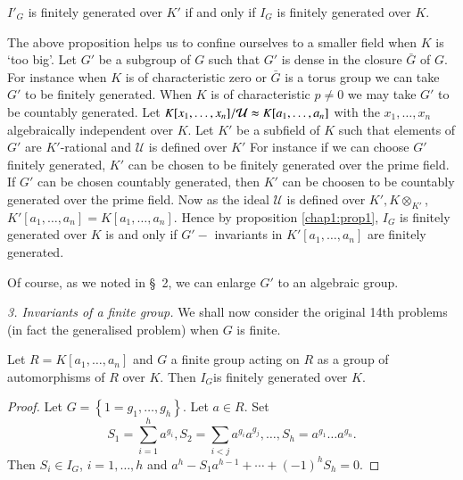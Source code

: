 \begin{proposition}\label{chap1:prop1}%
 $I'_G$ is finitely generated over $K'$ if and  only  if $I_G$ is
  finitely generated  over $K$. 
\end{proposition}

The above proposition helps us to confine ourselves to a smaller
field  when  $K$ is `too big'. Let $G'$ be a subgroup of $G$ such
that  $G'$  is dense in the  closure  $\bar{G}$ of $G$. For
instance  when  $K$ is  of characteristic zero  or $\bar{G}$ is a
torus  group  we can  take $G'$ to be  finitely generated. When  $K$ 
is  of characteristic  $p \neq 0$ we may  take $G'$ to be  countably
generated. Let  $K [x_1, \ldots , x_n] /  \mathcal{U}\thickapprox
K [a_1, \ldots , a_n]$ with the $x_1, \ldots , x_n$ algebraically
independent over $K$. Let  $K'$ be a subfield of $K$ such that
elements  of $G'$ are $K'$-rational and  $\mathcal{U}$ is defined
over $K'$ For instance  if we can choose  $G'$  finitely  generated,
$K'$ can be chosen to be finitely generated  over  the  prime
field. If  $G'$ can be  chosen  countably  generated, then  $K'$ can
be  choosen to be countably generated  over  the  prime  field. Now
as the  ideal $\mathcal{U}$ is  defined  over  $K', K \otimes_{K'}$, $K'
[a_1, \ldots , a_n]=K[a_1 , \ldots ,a_n]$. Hence by proposition
\ref{chap1:prop1}, 
$I_G$ is  finitely generated over  $K$ is and only  if $G'-$
invariants in $K' [a_1, \ldots, a_n]$ are  finitely  generated. 


Of course, as we noted  in \S\ 2, we can  enlarge  $G'$  to an
algebraic group. 

\medskip
\noindent\textit{3. Invariants of a finite group.}
 We shall  now consider  the  original 14th problems (in fact  the
 generalised problem) when   $G$ is  finite.  

\begin{thm}[E. Noether]%
 Let  $R=K [a_1, \ldots,a_n]$ and $G$ a finite group
  acting  on $R$ as a group  of automorphisms  of $R$  over  $K$. Then
  $I_G$\pageoriginale is finitely generated over $K$. 
 \end{thm}

\begin{proof}
Let $G= \left\{1=g_1, \ldots ,g_h \right\}$. Let  $a \in R$. Set 
$$
S_1=\sum_{i=1}^{h} a^{g_i}, S_2 = \sum_{i<j} a^{g_i}a ^{g_j}, \ldots ,
S_h = a^{g_1}\ldots a^{g_n}. 
$$
Then  $S_i \in I_G$, $i=1, \ldots, h$ and $a^h-S_1 a^{h-1}+ \cdots
+ (-1)^h S_h=0$. 
\end{proof}

